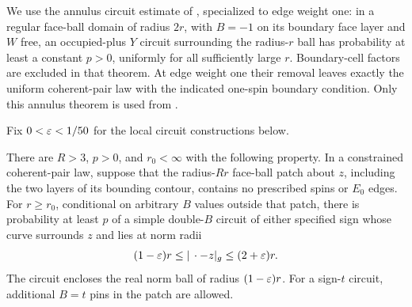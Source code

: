 We use the annulus circuit estimate of
\cite[Theorem~2.3, p.~9; proof in Appendix~B]{OpenAIWeighted2026},
specialized to edge weight one: in a regular face-ball domain of radius $2r$, with
$B=-1$ on its boundary face layer and $W$ free, an occupied-plus $Y$
circuit surrounding the radius-$r$ ball has probability at least a
constant $p>0$, uniformly for all sufficiently large $r$.  Boundary-cell
factors are excluded in that theorem.  At edge weight one their removal
leaves exactly the uniform coherent-pair law with the indicated
one-spin boundary condition.  Only this annulus theorem is used from
\cite{OpenAIWeighted2026}.

Fix $0<\varepsilon<1/50$ for the local circuit constructions below.

\begin{lemma}\label{lem:local-circuit}
There are $R>3$, $p>0$, and $r_0<\infty$ with the following property.  In a constrained coherent-pair law, suppose
that the radius-$Rr$ face-ball patch about $z$, including the two layers
of its bounding contour, contains no prescribed spins or $E_0$ edges.
For $r\ge r_0$, conditional on arbitrary $B$ values outside that patch,
there is probability at least $p$ of a simple double-$B$ circuit of either
specified sign whose curve surrounds $z$ and lies at norm radii
\begin{equation}\label{eq:local-circuit-annulus}
                (1-\varepsilon)r\le |\,\cdot-z|_g\le(2+\varepsilon)r.
\end{equation}
The circuit encloses the real norm ball of radius $(1-\varepsilon)r$.
For a sign-$t$ circuit, additional $B=t$ pins in the patch are allowed.
\end{lemma}
